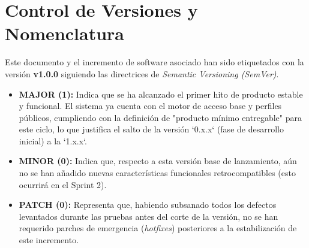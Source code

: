 \clearpage
\section{Control de Versiones y Nomenclatura}
\label{sec:versioning}

Este documento y el incremento de software asociado han sido etiquetados con la versión \textbf{v1.0.0} siguiendo las directrices de \textit{Semantic Versioning (SemVer)}. 

\begin{itemize}
    \item \textbf{MAJOR (1):} Indica que se ha alcanzado el primer hito de producto estable y funcional. El sistema ya cuenta con el motor de acceso base y perfiles públicos, cumpliendo con la definición de "producto mínimo entregable" para este ciclo, lo que justifica el salto de la versión `0.x.x` (fase de desarrollo inicial) a la `1.x.x`.
    \item \textbf{MINOR (0):} Indica que, respecto a esta versión base de lanzamiento, aún no se han añadido nuevas características funcionales retrocompatibles (esto ocurrirá en el Sprint 2).
    \item \textbf{PATCH (0):} Representa que, habiendo subsanado todos los defectos levantados durante las pruebas antes del corte de la versión, no se han requerido parches de emergencia (\textit{hotfixes}) posteriores a la estabilización de este incremento.
\end{itemize}